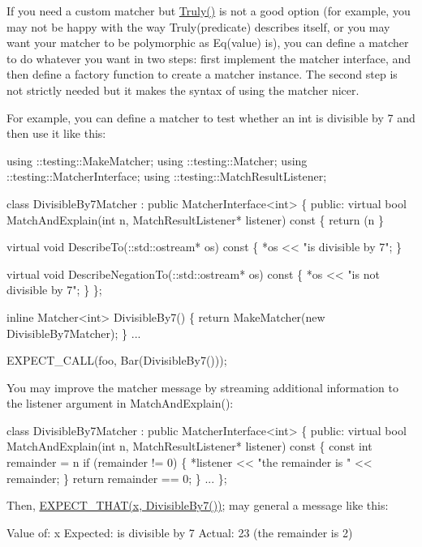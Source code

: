 If you need a custom matcher but {\ttfamily \hyperlink{namespacetesting_a5faf05cfaae6074439960048e478b1c8}{Truly()}} is not a good option (for example, you may not be happy with the way {\ttfamily Truly(predicate)} describes itself, or you may want your matcher to be polymorphic as {\ttfamily Eq(value)} is), you can define a matcher to do whatever you want in two steps\+: first implement the matcher interface, and then define a factory function to create a matcher instance. The second step is not strictly needed but it makes the syntax of using the matcher nicer.

For example, you can define a matcher to test whether an {\ttfamily int} is divisible by 7 and then use it like this\+: 
\begin{DoxyCode}
using ::testing::MakeMatcher;
using ::testing::Matcher;
using ::testing::MatcherInterface;
using ::testing::MatchResultListener;

class DivisibleBy7Matcher : public MatcherInterface<int> \{
 public:
  virtual bool MatchAndExplain(int n, MatchResultListener* listener) const \{
    return (n %
  \}

  virtual void DescribeTo(::std::ostream* os) const \{
    *os << "is divisible by 7";
  \}

  virtual void DescribeNegationTo(::std::ostream* os) const \{
    *os << "is not divisible by 7";
  \}
\};

inline Matcher<int> DivisibleBy7() \{
  return MakeMatcher(new DivisibleBy7Matcher);
\}
...

  EXPECT\_CALL(foo, Bar(DivisibleBy7()));
\end{DoxyCode}


You may improve the matcher message by streaming additional information to the {\ttfamily listener} argument in {\ttfamily Match\+And\+Explain()}\+:


\begin{DoxyCode}
class DivisibleBy7Matcher : public MatcherInterface<int> \{
 public:
  virtual bool MatchAndExplain(int n,
                               MatchResultListener* listener) const \{
    const int remainder = n %
    if (remainder != 0) \{
      *listener << "the remainder is " << remainder;
    \}
    return remainder == 0;
  \}
  ...
\};
\end{DoxyCode}


Then, {\ttfamily \hyperlink{gmock-matchers_8h_ac31e206123aa702e1152bb2735b31409}{E\+X\+P\+E\+C\+T\+\_\+\+T\+H\+A\+T(x, Divisible\+By7())};} may general a message like this\+: 
\begin{DoxyCode}
Value of: x
Expected: is divisible by 7
  Actual: 23 (the remainder is 2)
\end{DoxyCode}



